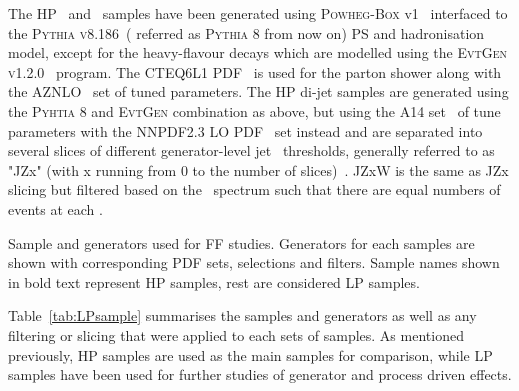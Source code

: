 	The \ac{HP}
	 \Zjets\ and \Wjets\ samples have been generated using \textsc{Powheg-Box} v1~\cite{powheg} interfaced to the \textsc{Pythia v8.186}~\cite{pythia8}( referred as \textsc{Pythia 8} from now on) \ac{PS} and hadronisation model, except for the heavy-flavour decays which are modelled using the \textsc{EvtGen v1.2.0}~\cite{evtgen} program. The \textsc{CTEQ6L1} \ac{PDF}~\cite{cteq6l1} is used for the parton shower along with the \textsc{AZNLO}~\cite{aznlo} set of tuned parameters.
	The \ac{HP} di-jet samples are generated using the \textsc{Pyhtia 8} and \textsc{EvtGen} combination as above, but using the \textsc{A14} set~\cite{ATL-PHYS-PUB-2014-021} of tune parameters with the \textsc{NNPDF2.3 LO} PDF~\cite{BALL2013244} set instead and are separated into several slices of different generator-level jet \pt\ thresholds, generally referred to as "JZx" (with x running from 0 to the number of slices)~\cite{Marshall:2016630}. 
	JZxW is the same as JZx slicing but filtered based on the \pt\ spectrum such that there are equal numbers of events at each \pt.   

\begin{table}[!hbt]
	\caption{Sample and generators used for \ac{FF} studies. Generators for each samples are shown with corresponding \ac{PDF} sets, selections and filters. Sample names shown in bold text represent \ac{HP} samples, rest are considered \ac{LP} samples.}
		
	\label{tab:LPsample}
	\end{table}	
	Table~\ref{tab:LPsample} summarises the samples and generators as well as any filtering or slicing that were applied to each sets of samples.
As mentioned previously, \ac{HP} samples are used as the main samples for comparison, while \ac{LP} samples have been used for further studies of generator and process driven effects.
